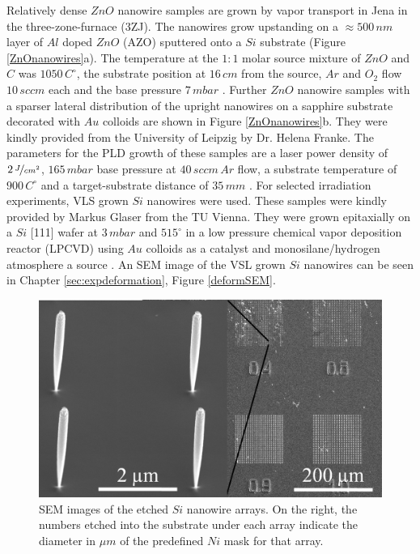 Relatively dense $ZnO$ nanowire samples are grown by vapor transport in Jena in the three-zone-furnace (3ZJ). The nanowires grow upstanding on a $\approx 500\,nm$ layer of $Al$ doped $ZnO$ (AZO) sputtered onto a $Si$ substrate (Figure \ref{ZnOnanowires}a). The temperature at the $1:1$ molar source mixture of $ZnO$ and $C$ was $1050\,C^\circ$, the substrate position at $16\, cm$ from the source, $Ar$ and $O_2$ flow $10\, sccm$ each and the base pressure $7\, mbar$ \cite{borchers_catalyst_2006, stichtenoth_dimensionseffekte_2008, muller_structural_2009,ogrisek_kontrolliertes_2013}. Further $ZnO$ nanowire samples with a sparser lateral distribution of the upright nanowires on a sapphire substrate decorated with $Au$ colloids are shown in Figure \ref{ZnOnanowires}b. They were kindly provided from the University of Leipzig by Dr. Helena Franke. The parameters for the PLD growth of these samples are a laser power density of $2\, \nicefrac{J}{cm^2}$, $165\, mbar$ base pressure at $40\, sccm\, Ar$ flow, a substrate temperature of $900\, C^\circ$ and a target-substrate distance of $35\,mm$ \cite{cao_tuning_2010}. For selected irradiation experiments, VLS grown $Si$ nanowires were used. These samples were kindly provided by Markus Glaser from the TU Vienna. They were grown epitaxially on a $Si$ [111] wafer at $3\,mbar$ and $515^\circ$ in a low pressure chemical vapor deposition reactor (LPCVD) using $Au$ colloids as a catalyst and monosilane/hydrogen atmosphere a source \cite{lugstein_pressure-induced_2008,johannes_anomalous_2015}. An SEM image of the VSL grown $Si$ nanowires can be seen in Chapter \ref{sec:expdeformation}, Figure \ref{deformSEM}.

\begin{figure}
	\centering
		\includegraphics[width=.5\textwidth]{images/SEMarray.jpg}
	\caption{SEM images of the etched $Si$ nanowire arrays. On the right, the numbers etched into the substrate under each array indicate the diameter in $\mu m$ of the predefined $Ni$ mask for that array.}
	\label{SEMarray}
\end{figure} 

